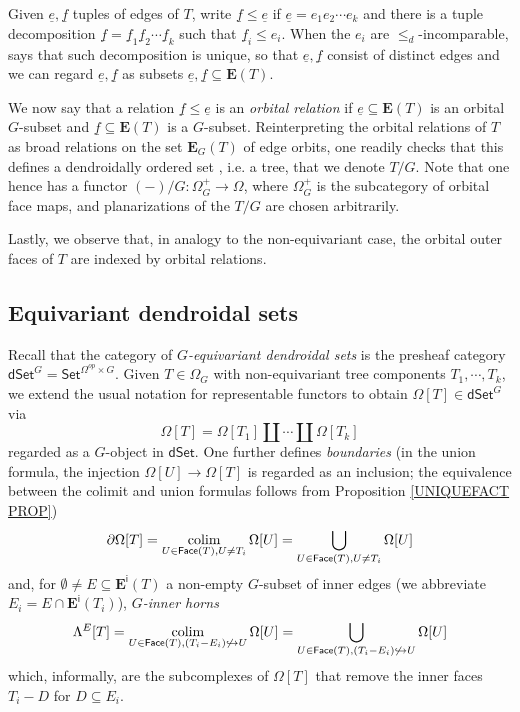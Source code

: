 \documentclass[a4paper,10pt
,draft
]{article}%
\begin{document}
\begin{remark}
Given $\underline{e},\underline{f}$ tuples of edges of $T$, 
write $\underline{f} \leq \underline{e}$
if $\underline{e} = e_1 e_2 \cdots e_k$
and there is a tuple decomposition
$\underline{f} = 
\underline{f}_1 \underline{f}_2 \cdots
\underline{f}_k$
such that $\underline{f}_i \leq e_i$.
When the $e_i$ are $\leq_d$-incomparable,
\cite[Prop. 5.30]{Per17} says that such decomposition is unique, so that $\underline{e},\underline{f}$ consist of distinct edges and we can regard 
$\underline{e},\underline{f}$ as subsets $\underline{e},\underline{f} \subseteq \boldsymbol{E}(T)$.
	
We now say that a relation
$\underline{f} \leq \underline{e}$	
is an \textit{orbital relation} if
$\underline{e} \subseteq \boldsymbol{E}(T)$
is an orbital $G$-subset and $\underline{f} \subseteq \boldsymbol{E}(T)$ is a $G$-subset. 
Reinterpreting the orbital relations of $T$ 
as broad relations on the set $\boldsymbol{E}_{G}(T)$ of edge orbits,
one readily checks that this defines a 
dendroidally ordered set \cite[Def. 5.9]{Per17},
i.e. a tree, that we denote $T/G$.
Note that one hence has a functor
$(-)/G \colon \Omega_G^+ \to \Omega$,
where $\Omega_G^+$ is the subcategory of orbital face maps,
and planarizations of the $T/G$ are chosen arbitrarily.

Lastly, we observe that, in analogy to the non-equivariant case,
the orbital outer faces of $T$ are indexed by orbital relations.
\end{remark}



\subsection{Equivariant dendroidal sets}\label{EQDENDSETS SEC}

Recall \cite[\S 5.4]{Per17} that the category of 
\textit{$G$-equivariant dendroidal sets}
is the presheaf category 
$\mathsf{dSet}^G = \mathsf{Set}^{\Omega^{op} \times G}$.
Given $T \in \Omega_G$ with non-equivariant tree components $T_1,\cdots,T_k$,
we extend the usual notation for representable functors 
to obtain $\Omega[T] \in \mathsf{dSet}^G$ via
\[
	\Omega[T] = \Omega[T_1] \amalg \cdots \amalg \Omega[T_k]
\]
regarded as a $G$-object in $\mathsf{dSet}$.
One further defines \textit{boundaries} (in the union formula, 
the injection $\Omega[U] \to \Omega[T]$ is regarded as 
an inclusion; the equivalence between the colimit and union formulas follows from Proposition \ref{UNIQUEFACT PROP})
\[
	\partial \Omega[T] = 
	\mathop{\operatorname{colim}}_{U \in \mathsf{Face}(T),U \neq T_i}
	\Omega[U] =
	\bigcup_{U \in \mathsf{Face}(T),U \neq T_i}
	\Omega[U]
\]
and, for $\emptyset \neq E \subseteq \boldsymbol{E}^{\mathsf{i}}(T)$ a
non-empty $G$-subset of inner edges 
(we abbreviate $E_i = E \cap \boldsymbol{E}^{\mathsf{i}}(T_i)$), \textit{$G$-inner horns}
\[
	\Lambda^{E}[T] = 
	\mathop{\operatorname{colim}}_{U \in 
	\mathsf{Face}(T),
	(T_i - E_i) \not \hookrightarrow U}
	\Omega[U] =
	\bigcup_{U \in 
	\mathsf{Face}(T),
	(T_i - E_i) \not \hookrightarrow U}
	\Omega[U]
\]
which, informally, are the subcomplexes of $\Omega[T]$ that remove the inner faces $T_i-D$ for $D \subseteq E_i$.
\end{document}
